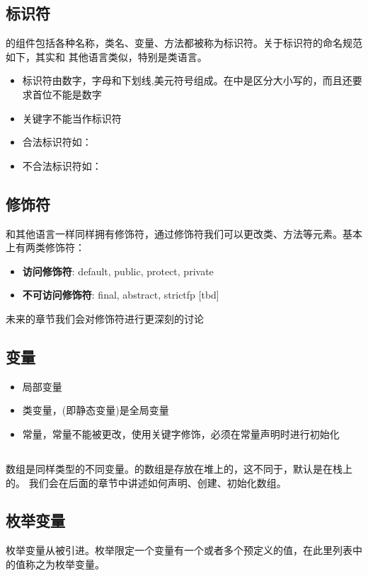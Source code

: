 \documentclass{article}
\begin{document}
\subsection{标识符}
的组件包括各种名称，类名、变量、方法都被称为标识符。关于标识符的命名规范如下，其实和
其他语言类似，特别是类语言。
\begin{itemize}
\item {}标识符由数字，字母和下划线,美元符号组成。在中是区分大小写的，而且还要
求首位不能是数字
\item {}关键字不能当作标识符
\item 合法标识符如：
\item 不合法标识符如：
\end{itemize}

\subsection{修饰符}
和其他语言一样同样拥有修饰符，通过修饰符我们可以更改类、方法等元素。基本上有两类修饰符：
\begin{itemize}
\item {\bf 访问修饰符}: default, public, protect, private
\item {\bf 不可访问修饰符}: final, abstract, strictfp [tbd]
\end{itemize}

未来的章节我们会对修饰符进行更深刻的讨论

\subsection{ 变量}
\begin{itemize}
\item 局部变量
\item 类变量，(即静态变量)是全局变量
\item 常量，常量不能被更改，使用关键字修饰，必须在常量声明时进行初始化
\end{itemize}

\subsection{}
数组是同样类型的不同变量。的数组是存放在堆上的，这不同于，默认是在栈上的。
我们会在后面的章节中讲述如何声明、创建、初始化数组。

\subsection{ 枚举变量}
枚举变量从被引进。枚举限定一个变量有一个或者多个预定义的值，在此里列表中的值称之为枚举变量。
\end{document}
